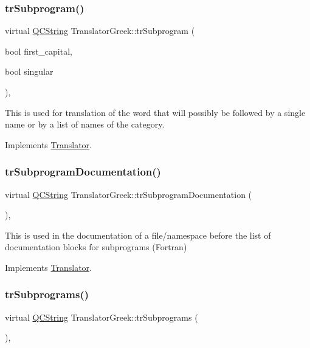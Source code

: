 \subsubsection{\texorpdfstring{trSubprogram()}{trSubprogram()}}
{\footnotesize\ttfamily virtual \mbox{\hyperlink{class_q_c_string}{Q\+C\+String}} Translator\+Greek\+::tr\+Subprogram (\begin{DoxyParamCaption}\item[{bool}]{first\+\_\+capital,  }\item[{bool}]{singular }\end{DoxyParamCaption})\hspace{0.3cm}{\ttfamily [inline]}, {\ttfamily [virtual]}}

This is used for translation of the word that will possibly be followed by a single name or by a list of names of the category. 

Implements \mbox{\hyperlink{class_translator}{Translator}}.

\mbox{\label{class_translator_greek_a60dfbe2aabeaade3e43bf976f95e7ae4}} 
\subsubsection{\texorpdfstring{trSubprogramDocumentation()}{trSubprogramDocumentation()}}
{\footnotesize\ttfamily virtual \mbox{\hyperlink{class_q_c_string}{Q\+C\+String}} Translator\+Greek\+::tr\+Subprogram\+Documentation (\begin{DoxyParamCaption}{ }\end{DoxyParamCaption})\hspace{0.3cm}{\ttfamily [inline]}, {\ttfamily [virtual]}}

This is used in the documentation of a file/namespace before the list of documentation blocks for subprograms (Fortran) 

Implements \mbox{\hyperlink{class_translator}{Translator}}.

\mbox{\label{class_translator_greek_ab4d674e3cde5cc46bf59c74b2a2cf364}} 
\subsubsection{\texorpdfstring{trSubprograms()}{trSubprograms()}}
{\footnotesize\ttfamily virtual \mbox{\hyperlink{class_q_c_string}{Q\+C\+String}} Translator\+Greek\+::tr\+Subprograms (\begin{DoxyParamCaption}{ }\end{DoxyParamCaption})\hspace{0.3cm}{\ttfamily [inline]}, {\ttfamily [virtual]}}

